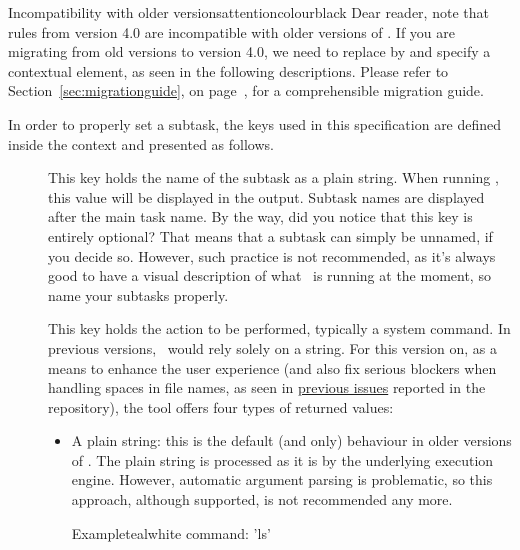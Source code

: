 \begin{description}
\begin{messagebox}{Incompatibility with older versions}{attentioncolour}{\icerror}{black}
Dear reader, note that rules from version 4.0 are incompatible with older versions of \arara. If you are migrating from old versions to version 4.0, we need to replace  by  and specify a contextual element, as seen in the following descriptions. Please refer to Section~\ref{sec:migrationguide}, on page~\pageref{sec:migrationguide}, for a comprehensible migration guide.
\end{messagebox}

In order to properly set a subtask, the keys used in this specification are defined inside the  context and presented as follows.

\begin{description}
\item[] This key holds the name of the subtask as a plain string. When running \arara, this value will be displayed in the output. Subtask names are displayed after the main task name. By the way, did you notice that this key is entirely optional? That means that a subtask can simply be unnamed, if you decide so. However, such practice is not recommended, as it's always good to have a visual description of what \arara\ is running at the moment, so name your subtasks properly.

\item[] This key holds the action to be performed, typically a system command. In previous versions, \arara\ would rely solely on a string. For this version on, as a means to enhance the user experience (and also fix serious blockers when handling spaces in file names, as seen in \href{https://github.com/cereda/arara/issues}{previous issues} reported in the repository), the tool offers four types of returned values:

\begin{itemize}[label={--}]
\item A plain string: this is the default (and only) behaviour in older versions of \arara. The plain string is processed as it is by the underlying execution engine. However, automatic argument parsing is problematic, so this approach, although supported, is not recommended any more.

\begin{codebox}{Example}{teal}{\icnote}{white}
command: 'ls'
\end{codebox}


\end{itemize}
\end{description}
\end{description}
